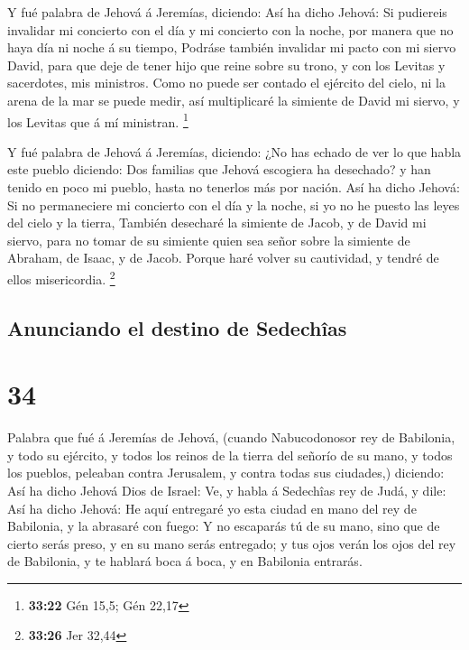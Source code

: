  Y fué palabra de Jehová á Jeremías, diciendo:
 Así ha dicho Jehová: Si pudiereis invalidar mi concierto
con el día y mi concierto con la noche, por manera que no haya día ni
noche á su tiempo,  Podráse también invalidar mi pacto con
mi siervo David, para que deje de tener hijo que reine sobre su trono, y
con los Levitas y sacerdotes, mis ministros.  Como no puede
ser contado el ejército del cielo, ni la arena de la mar se puede medir,
así multiplicaré la simiente de David mi siervo, y los Levitas que á mí
ministran. \footnote{\textbf{33:22} Gén 15,5; Gén 22,17}

 Y fué palabra de Jehová á Jeremías, diciendo:
 ¿No has echado de ver lo que habla este pueblo diciendo:
Dos familias que Jehová escogiera ha desechado? y han tenido en poco mi
pueblo, hasta no tenerlos más por nación.  Así ha dicho
Jehová: Si no permaneciere mi concierto con el día y la noche, si yo no
he puesto las leyes del cielo y la tierra,  También
desecharé la simiente de Jacob, y de David mi siervo, para no tomar de
su simiente quien sea señor sobre la simiente de Abraham, de Isaac, y de
Jacob. Porque haré volver su cautividad, y tendré de ellos misericordia.
\footnote{\textbf{33:26} Jer 32,44}

\hypertarget{anunciando-el-destino-de-sedechuxeeas}{%
\subsection{Anunciando el destino de
Sedechîas}\label{anunciando-el-destino-de-sedechuxeeas}}

\hypertarget{section-33}{%
\section{34}\label{section-33}}

 Palabra que fué á Jeremías de Jehová, (cuando Nabucodonosor
rey de Babilonia, y todo su ejército, y todos los reinos de la tierra
del señorío de su mano, y todos los pueblos, peleaban contra Jerusalem,
y contra todas sus ciudades,) diciendo:  Así ha dicho Jehová
Dios de Israel: Ve, y habla á Sedechîas rey de Judá, y dile: Así ha
dicho Jehová: He aquí entregaré yo esta ciudad en mano del rey de
Babilonia, y la abrasaré con fuego:  Y no escaparás tú de su
mano, sino que de cierto serás preso, y en su mano serás entregado; y
tus ojos verán los ojos del rey de Babilonia, y te hablará boca á boca,
y en Babilonia entrarás.

